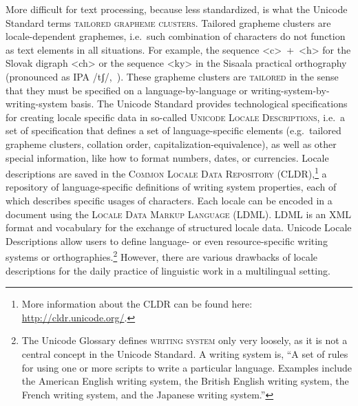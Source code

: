 More difficult for text processing, because less standardized, is what the
Unicode Standard terms \textsc{tailored grapheme clusters}. Tailored grapheme
clusters are locale-dependent graphemes, i.e.~such combination of characters do
not function as text elements in all situations. For example, the sequence
<c>~+~<h> for the Slovak digraph <ch> or the sequence <ky> in the Sisaala
practical orthography (pronounced as IPA /tʃ/,~\cite{Moran2006}). These grapheme
clusters are \textsc{tailored} in the sense that they must be specified on a
language-by-language or writing-system-by-writing-system basis. The Unicode
Standard provides technological specifications for creating locale specific data
in so-called \textsc{Unicode Locale Descriptions}, i.e.~a set of specification
that defines a set of language-specific elements (e.g.~tailored grapheme
clusters, collation order, capitalization-equivalence), as well as other special
information, like how to format numbers, dates, or currencies. Locale
descriptions are saved in the \textsc{Common Locale Data Repository
(CLDR)},\footnote{More information about the CLDR can be found here:
\url{http://cldr.unicode.org/}.} a repository of
language-specific definitions of writing system properties, each of which
describes specific usages of characters. Each locale can be encoded in a
document using the \textsc{Locale Data Markup Language (LDML)}. LDML is an XML
format and vocabulary for the exchange of structured locale data. Unicode Locale
Descriptions allow users to define language- or even resource-specific writing
systems or orthographies.\footnote{The Unicode Glossary defines \textsc{writing
system} only very loosely, as it is not a central concept in the Unicode
Standard. A writing system is, ``A set of rules for using one or more scripts to
write a particular language. Examples include the American English writing
system, the British English writing system, the French writing system, and the
Japanese writing system.''} However, there are various drawbacks of locale
descriptions for the daily practice of linguistic work in a multilingual setting.

